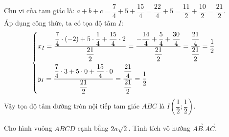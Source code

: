 \begin{vd}
{\begin{itemize}
\end{itemize}
Chu vi của tam giác là: $a + b + c = \dfrac{7}{4} + 5 + \dfrac{15}{4} = \dfrac{22}{4} + 5 = \dfrac{11}{2} + \dfrac{10}{2} = \dfrac{21}{2}$.\\
Áp dụng công thức, ta có tọa độ tâm $I$:
\[ \begin{cases} x_I = \dfrac{\dfrac{7}{4} \cdot (-2) + 5 \cdot \dfrac{1}{4} + \dfrac{15}{4} \cdot 2}{\dfrac{21}{2}} = \dfrac{-\dfrac{14}{4} + \dfrac{5}{4} + \dfrac{30}{4}}{\dfrac{21}{2}} = \dfrac{\dfrac{21}{4}}{\dfrac{21}{2}} = \dfrac{1}{2} \vspace{5pt} \\ y_I = \dfrac{\dfrac{7}{4} \cdot 3 + 5 \cdot 0 + \dfrac{15}{4} \cdot 0}{\dfrac{21}{2}} = \dfrac{\dfrac{21}{4}}{\dfrac{21}{2}} = \dfrac{1}{2} \end{cases} \]
Vậy tọa độ tâm đường tròn nội tiếp tam giác $ABC$ là $I\left(\dfrac{1}{2}; \dfrac{1}{2}\right)$.
	}  
\end{vd}

\begin{baitap}
	Cho hình vuông $ABCD$ cạnh bằng $2a\sqrt{2}$. Tính tích vô hướng $\overrightarrow{AB}.\overrightarrow{AC}.$
\end{baitap}

